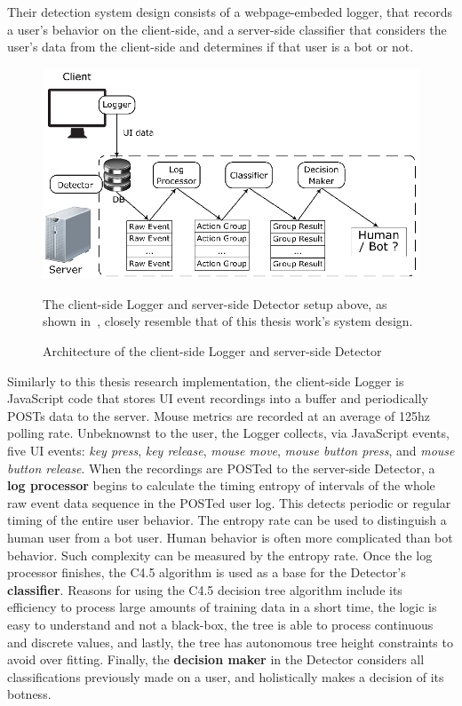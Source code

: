 Their detection system design consists of a webpage-embeded logger, that records a user's behavior on the client-side, and a server-side classifier that considers the user's data from the client-side and determines if that user is a bot or not.
\begin{figure}[!h]
    \centering
    \includegraphics[width=.8\columnwidth]{figures/bot_or_human_system_architecture}
    \caption{Architecture of the client-side Logger and server-side Detector}
    {\small The client-side Logger and server-side Detector setup above, as shown in~\cite{bot_or_human}, closely resemble that of this thesis work's system design.}
    \label{fig:bot-or-human-architecture}
\end{figure}
Similarly to this thesis research implementation, the client-side Logger is JavaScript code that stores UI event recordings into a buffer and periodically POSTs data to the server.
Mouse metrics are recorded at an average of 125hz polling rate.
Unbeknownst to the user, the Logger collects, via JavaScript events, five UI events: \textit{key press}, \textit{key release}, \textit{mouse move}, \textit{mouse button press}, and \textit{mouse button release}.
When the recordings are POSTed to the server-side Detector, a \textbf{log processor} begins to calculate the timing entropy of intervals of the whole raw event data sequence in the POSTed user log.
This detects periodic or regular timing of the entire user behavior.
The entropy rate can be used to distinguish a human user from a bot user.
Human behavior is often more complicated than bot behavior.
Such complexity can be measured by the entropy rate.
Once the log processor finishes, the C4.5 algorithm is used as a base for the Detector's \textbf{classifier}.
Reasons for using the C4.5 decision tree algorithm include its efficiency to process large amounts of training data in a short time, the logic is easy to understand and not a black-box, the tree is able to process continuous and discrete values, and lastly, the tree has autonomous tree height constraints to avoid over fitting.
Finally, the \textbf{decision maker} in the Detector considers all classifications previously made on a user, and holistically makes a decision of its botness.
